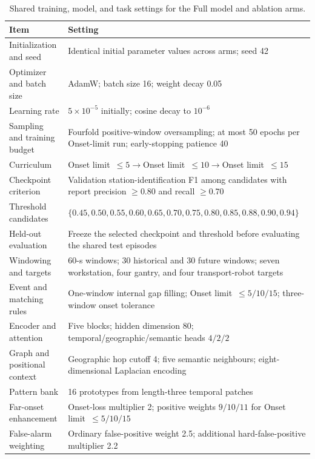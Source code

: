 \documentclass[a4paper,fleqn]{cas-dc}
\begin{document}
\begin{table}[pos=!bp]
\centering
\caption{Shared training, model, and task settings for the Full model and ablation arms.}
\label{tab:shared-training-protocol}
\footnotesize
\setlength{\tabcolsep}{6pt}
\renewcommand{\arraystretch}{1.05}
\begin{tabularx}{\textwidth}{@{}lX@{}}
\toprule
Item & Setting \\
\midrule
Initialization and seed & Identical initial parameter values across arms; seed 42 \\
Optimizer and batch size & AdamW; batch size 16; weight decay 0.05 \\
Learning rate & $5\times10^{-5}$ initially; cosine decay to $10^{-6}$ \\
Sampling and training budget & Fourfold positive-window oversampling; at most 50 epochs per Onset-limit run; early-stopping patience 40 \\
Curriculum & Onset limit~$\leq5\rightarrow$Onset limit~$\leq10\rightarrow$Onset limit~$\leq15$ \\
Checkpoint criterion & Validation station-identification F1 among candidates with report precision $\geq0.80$ and recall $\geq0.70$ \\
Threshold candidates & $\{0.45,0.50,0.55,0.60,0.65,0.70,0.75,0.80,0.85,0.88,0.90,0.94\}$ \\
Held-out evaluation & Freeze the selected checkpoint and threshold before evaluating the shared test episodes \\
Windowing and targets & 60-s windows; 30 historical and 30 future windows; seven workstation, four gantry, and four transport-robot targets \\
Event and matching rules & One-window internal gap filling; Onset limit~$\leq5/10/15$; three-window onset tolerance \\
Encoder and attention & Five blocks; hidden dimension 80; temporal/geographic/semantic heads $4/2/2$ \\
Graph and positional context & Geographic hop cutoff 4; five semantic neighbours; eight-dimensional Laplacian encoding \\
Pattern bank & 16 prototypes from length-three temporal patches \\
Far-onset enhancement & Onset-loss multiplier 2; positive weights $9/10/11$ for Onset limit~$\leq5/10/15$ \\
False-alarm weighting & Ordinary false-positive weight 2.5; additional hard-false-positive multiplier 2.2 \\
\bottomrule
\end{tabularx}
\end{table}
\end{document}
